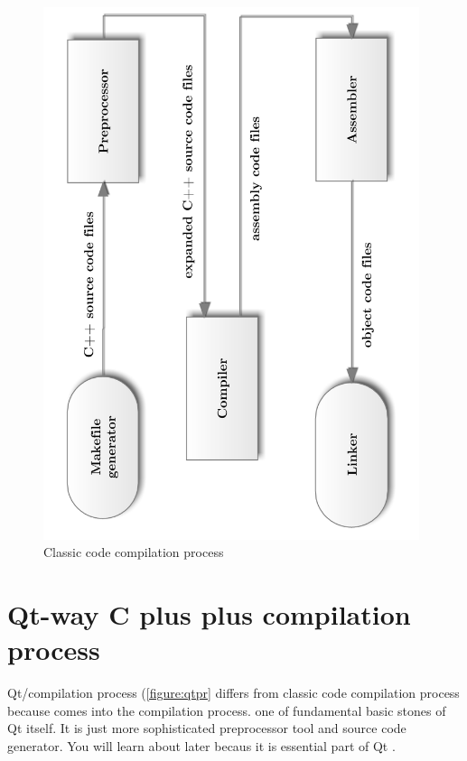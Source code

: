 \begin{figure}[ht]
\centering
\includegraphics[angle=-90,width=11cm]{graphics/laboratory/09-classiccomp.pdf}
\caption{Classic \cpp code compilation process}\label{figure:classicpr}
\end{figure}

\section{Qt-way C plus plus compilation process}
Qt/\cpp compilation process (\autoref{figure:qtpr} differs from classic \cpp code compilation process because  comes into the compilation process.  one of fundamental basic stones of Qt itself. It is just more sophisticated preprocessor tool and source code generator. You will learn about  later becaus it is essential part of Qt .

